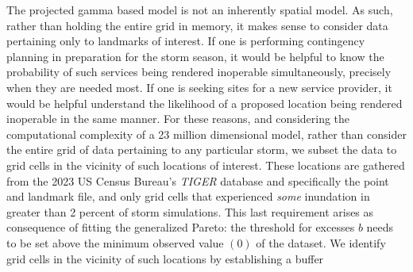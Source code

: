 The projected gamma based model is not an inherently spatial model.  As such, 
    rather than holding the entire grid in memory, it makes sense to consider 
    data pertaining only to landmarks of interest.    If one is performing 
    contingency planning in preparation for the storm season, it would be 
    helpful to know the probability of such services being rendered inoperable 
    simultaneously, precisely when they are needed most.  If one is seeking 
    sites for a new service provider, it would be helpful understand the 
    likelihood of a proposed location being rendered inoperable in the same 
    manner.  For these reasons, and considering the computational complexity of 
    a 23 million dimensional model, rather than consider the entire grid of data 
    pertaining to any particular storm, we subset the data to grid cells in the 
    vicinity of such locations of interest.  These locations are gathered from 
    the 2023 US Census Bureau's \emph{TIGER} database \needcite and specifically 
    the point and landmark file, and only grid cells that experienced \emph{some} 
    inundation in greater than 2  percent of storm 
    simulations.   This last requirement arises as consequence of fitting the 
    generalized Pareto: the threshold for excesses $b$ needs to be set above the 
    minimum observed value $(0)$ of the dataset.  
      We identify grid cells in 
    the vicinity of such locations by establishing a buffer 



